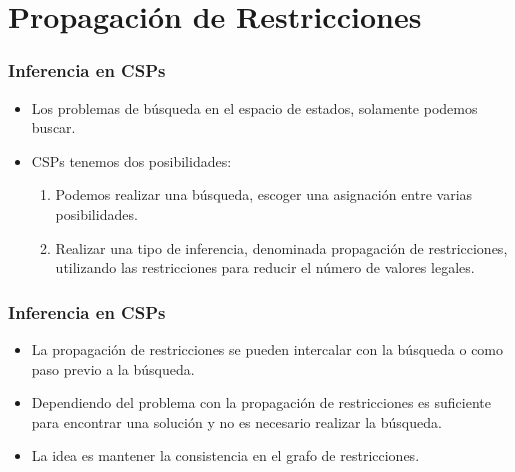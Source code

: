 \documentclass[xcolor=table]{beamer}
\begin{document}
\section[Propagación]{Propagación de Restricciones}


\begin{frame}  \frametitle{Inferencia en CSPs} \small

\begin{itemize}
\item Los problemas de búsqueda en el espacio de estados, solamente podemos buscar.
\item CSPs tenemos dos posibilidades:
\begin{enumerate}
\item Podemos realizar una búsqueda, escoger una asignación entre varias posibilidades.
\item Realizar una tipo de inferencia, denominada propagación de restricciones, utilizando las restricciones para reducir el número de valores legales.
\end{enumerate}

\end{itemize}

\end{frame} 


\begin{frame}  \frametitle{Inferencia en CSPs} \small

\begin{itemize}
\item La propagación de restricciones se pueden intercalar con la búsqueda o como paso previo a la búsqueda.

\item Dependiendo del problema con la propagación de restricciones es suficiente para encontrar una solución y no es necesario realizar la búsqueda.
\item La idea es mantener la consistencia en el grafo de restricciones.

\end{itemize}

\end{frame} 

\end{document}
